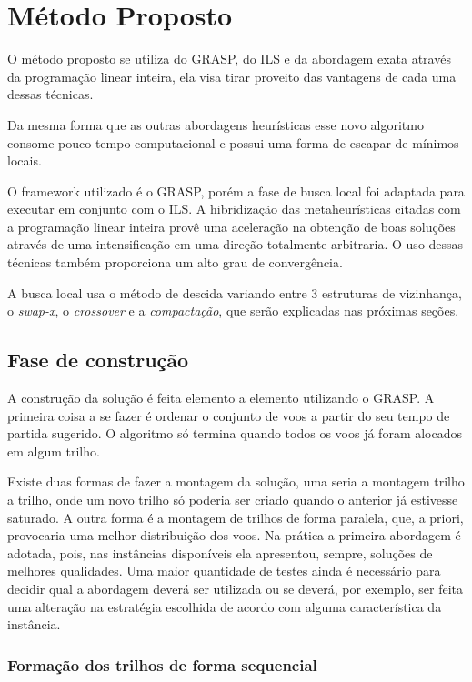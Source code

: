   \chapter{Método Proposto}
  
  O método proposto se utiliza do GRASP, do ILS e da abordagem exata através da
  programação linear inteira, ela visa tirar proveito das vantagens de cada uma
  dessas técnicas.
  
	Da mesma forma que as outras abordagens heurísticas esse novo algoritmo
	consome pouco tempo computacional e possui uma forma de escapar de mínimos
	locais.
  
  O framework utilizado é o GRASP, porém a fase de busca local foi
  adaptada para executar em conjunto com o ILS. A hibridização das
  metaheurísticas citadas com a programação linear inteira provê uma aceleração
  na obtenção de boas soluções através de uma intensificação em uma direção
  totalmente arbitraria. O uso dessas técnicas também proporciona um alto grau
  de convergência.

  A busca local usa o método de descida variando entre 3 estruturas de
  vizinhança, o \textit{swap-x}, o \textit{crossover} e a \textit{compactação},
  que serão explicadas nas próximas seções.
  
\section{Fase de construção}
  
  A construção da solução é feita elemento a elemento utilizando o
  GRASP. A primeira coisa a se fazer é ordenar o conjunto de voos a partir do
  seu tempo de partida sugerido. O algoritmo só termina quando todos os voos já
  foram alocados em algum trilho.
  
  Existe duas formas de fazer a montagem da solução, uma seria a montagem
  trilho a trilho, onde um novo trilho só poderia ser criado quando o anterior
  já estivesse saturado. A outra forma é a montagem de trilhos de forma
  paralela, que, a priori, provocaria uma melhor distribuição dos voos. Na
  prática a primeira abordagem é adotada, pois, nas instâncias disponíveis ela
  apresentou, sempre, soluções de melhores qualidades. Uma maior quantidade de
  testes ainda é necessário para decidir qual a abordagem deverá ser utilizada
  ou se deverá, por exemplo, ser feita uma alteração na estratégia escolhida de
  acordo com alguma característica da instância.
  
\subsection{Formação dos trilhos de forma sequencial}


